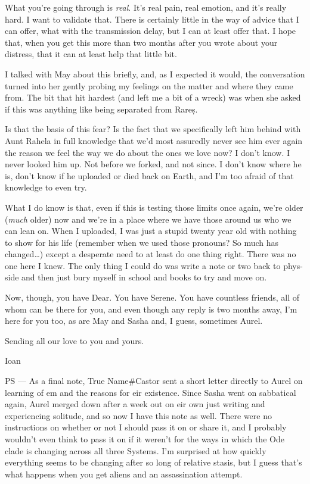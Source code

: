 What you're going through is \emph{real}. It's real pain, real emotion, and it's really hard. I want to validate that. There is certainly little in the way of advice that I can offer, what with the transmission delay, but I can at least offer that. I hope that, when you get this more than two months after you wrote about your distress, that it can at least help that little bit.

I talked with May about this briefly, and, as I expected it would, the conversation turned into her gently probing my feelings on the matter and where they came from. The bit that hit hardest (and left me a bit of a wreck) was when she asked if this was anything like being separated from Rareș.

Is that the basis of this fear? Is the fact that we specifically left him behind with Aunt Rahela in full knowledge that we'd most assuredly never see him ever again the reason we feel the way we do about the ones we love now? I don't know. I never looked him up. Not before we forked, and not since. I don't know where he is, don't know if he uploaded or died back on Earth, and I'm too afraid of that knowledge to even try.

What I do know is that, even if this is testing those limits once again, we're older (\emph{much} older) now and we're in a place where we have those around us who we can lean on. When I uploaded, I was just a stupid twenty year old with nothing to show for his life (remember when we used those pronouns? So much has changed\ldots) except a desperate need to at least do one thing right. There was no one here I knew. The only thing I could do was write a note or two back to phys-side and then just bury myself in school and books to try and move on.

Now, though, you have Dear. You have Serene. You have countless friends, all of whom can be there for you, and even though any reply is two months away, I'm here for you too, as are May and Sasha and, I guess, sometimes Aurel.

Sending all our love to you and yours.

Ioan

PS — As a final note, True Name\#Castor sent a short letter directly to Aurel on learning of em and the reasons for eir existence. Since Sasha went on sabbatical again, Aurel merged down after a week out on eir own just writing and experiencing solitude, and so now I have this note as well. There were no instructions on whether or not I should pass it on or share it, and I probably wouldn't even think to pass it on if it weren't for the ways in which the Ode clade is changing across all three Systems. I'm surprised at how quickly everything seems to be changing after so long of relative stasis, but I guess that's what happens when you get aliens and an assassination attempt.

